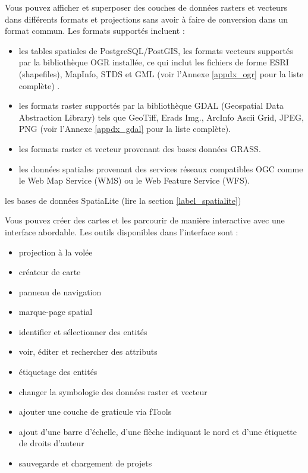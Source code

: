 
Vous pouvez afficher et superposer des couches de données rasters et vecteurs dans différents formats et projections sans avoir à faire de conversion dans un format commun. Les formats supportés incluent :

\begin{itemize}
\item les tables spatiales de PostgreSQL/PostGIS, les formats vecteurs supportés par la bibliothèque OGR installée, ce qui inclut les fichiers de forme ESRI (shapefiles), MapInfo, STDS et GML (voir l'Annexe \ref{appdx_ogr} pour la liste complète) .
\item les formats raster supportés par la bibliothèque GDAL (Geospatial Data Abstraction Library) tels que GeoTiff, Erads Img., ArcInfo Ascii Grid, JPEG, PNG (voir l'Annexe \ref{appdx_gdal} pour la liste complète).

\item les formats raster et vecteur provenant des bases données GRASS. 
\item les données spatiales provenant des services réseaux compatibles OGC comme le Web Map Service (WMS) ou le Web Feature Service (WFS).
\end{itemize}
\item les bases de données SpatiaLite (lire la section \ref{label_spatialite}) 


Vous pouvez créer des cartes et les parcourir de manière interactive avec une interface abordable. Les outils disponibles dans l'interface sont :

\begin{itemize}
\item projection à la volée
\item créateur de carte
\item panneau de navigation
\item marque-page spatial
\item identifier et sélectionner des entités
\item voir, éditer et rechercher des attributs
\item étiquetage des entités
\item changer la symbologie des données raster et vecteur
\item ajouter une couche de graticule via fTools
\item ajout d'une barre d'échelle, d'une flèche indiquant le nord et d'une étiquette de droits d'auteur
\item sauvegarde et chargement de projets
\end{itemize}

